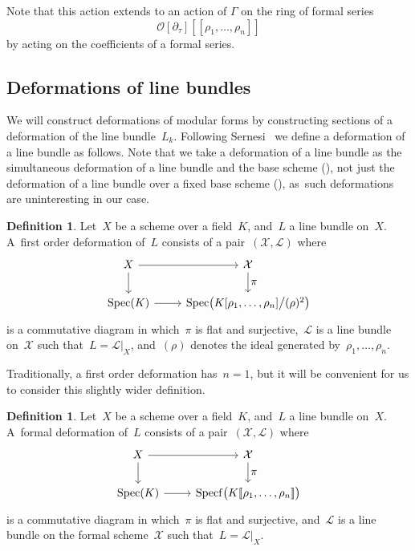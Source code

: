 \documentclass[JEP,XML,SOM,Unicode,published]{cedram}
\let\ts\textstyle
\theoremstyle{plain}
\theoremstyle{definition}
\newtheorem{definition}[theoremcounter]{Definition}
\newcommand{\cL}{\ensuremath{\mathcal{L}}}
\newcommand{\cO}{\ensuremath{\mathcal{O}}}
\newcommand{\cX}{\ensuremath{\mathcal{X}}}
\newcommand{\llbrkt}{[\![}
\newcommand{\rrbrkt}{]\!]}
\let\Ga\Gamma
\DeclareMathOperator{\Spec}{Spec}
\DeclareMathOperator{\Specf}{Specf}
\begin{document}
Note that this action extends to an action of $\Ga$ on the ring of formal series
\begin{equation*}
\cO[\partial_\tau]\llbrkt \rho_1, \ldots, \rho_n \rrbrkt
\end{equation*}
by acting on the coefficients of a formal series.

\subsection{Deformations of line bundles}
\label{ssec:preliminaries:deformations}

We will construct deformations of modular forms by constructing sections of a deformation of the line bundle~$L_k$.
Following Sernesi~\cite{sernesi06} we define a deformation of a line bundle as follows. Note that we take a deformation of a line bundle as the simultaneous deformation of a line bundle and the base scheme (\cite[\S 3.3.3]{sernesi06}), not just the deformation of a line bundle over a fixed base scheme (\cite[\S 3.3.1]{sernesi06}), as~such deformations are uninteresting in our case.

\begin{definition}
\label{def:first_order_deformation_line_bundle}
Let~$X$ be a scheme over a field~$K$, and~$L$ a line bundle on~$X$. A~first order deformation of~$L$ consists of a pair~$(\cX,\cL)$ where
\[
\begin{tikzcd}
X\arrow[r] \arrow[d]& \cX\arrow[d,"\ts\pi"]\\
\Spec(K) \arrow[r]& \Spec\bigl(K[\rho_1,\ldots,\rho_n] \big/ (\rho)^2 \bigr)
\end{tikzcd}
\]
is a commutative diagram in which~$\pi$ is flat and surjective,~$\cL$ is a line bundle on~$\cX$ such that~$L=\cL|_X$, and~$(\rho)$ denotes the ideal generated by~$\rho_1,\ldots,\rho_n$.
\end{definition}

Traditionally, a first order deformation has~$n=1$, but it will be convenient for us to consider this slightly wider definition.

\begin{definition}
\label{def:formal_deformation_line_bundle}
Let~$X$ be a scheme over a field~$K$, and~$L$ a line bundle on~$X$. A~formal deformation of~$L$ consists of a pair~$(\cX,\cL)$ where
\[
\begin{tikzcd}
X\arrow[r] \arrow[d]& \cX\arrow[d,"\ts\pi"]\\
\Spec(K) \arrow[r]& \Specf\bigl(K\llbrkt \rho_1,\ldots,\rho_n \rrbrkt \bigr)
\end{tikzcd}
\]
is a commutative diagram in which~$\pi$ is flat and surjective, and~$\cL$ is a line bundle on the formal scheme~$\cX$ such that~$L=\cL|_X$.
\end{definition}
\end{document}
